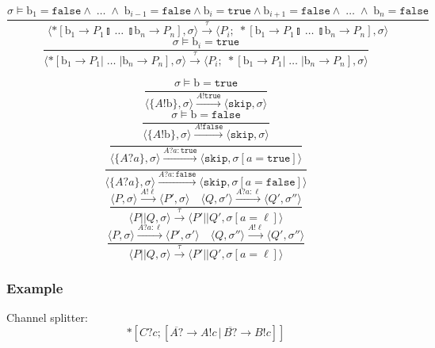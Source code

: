 \documentclass[compress]{beamer}
\begin{document}
\begin{frame}
$$    %
        \frac{\sigma \models \mathrm{b}_1 = \mathtt{false} \wedge \; \ldots \; \wedge \; \mathrm{b}_{i-1} = \mathtt{false} \wedge \mathrm{b}_i = \mathtt{true} \wedge \mathrm{b}_{i+1} = \mathtt{false} \wedge \; \ldots \; \wedge \; \mathrm{b}_n = \mathtt{false}} {\langle *[ \mathrm{b}_1 \rightarrow P_1  \talloblong \; \ldots \; \talloblong \mathrm{b}_n \rightarrow P_n ] , \sigma \rangle \xrightarrow{\tau} \langle P_i; \; *[ \mathrm{b}_1 \rightarrow P_1  \talloblong \; \ldots \; \talloblong \mathrm{b}_n \rightarrow P_n ] , \sigma\rangle  } $$$$
        \frac{\sigma \models \mathrm{b}_i = \mathtt{true}} {\langle *[ \mathrm{b}_1 \rightarrow P_1  | \; \ldots \; | \mathrm{b}_n \rightarrow P_n ] , \sigma \rangle \xrightarrow{\tau} \langle P_i;\;*[ \mathrm{b}_1 \rightarrow P_1  | \; \ldots \; | \mathrm{b}_n \rightarrow P_n ] , \sigma\rangle  }
    $$
\end{frame}
\begin{frame}
    \small
    $$
        \frac{\sigma \models \mathrm{b} = \mathtt{true}}{\langle \{A!\mathrm{b}\}, \sigma \rangle \xrightarrow{A!\mathtt{true}} \langle \mathtt{skip}, \sigma \rangle} $$$$
        \frac{\sigma \models \mathrm{b} = \mathtt{false}}{\langle \{A!\mathrm{b}\}, \sigma \rangle \xrightarrow{A!\mathtt{false}} \langle \mathtt{skip}, \sigma \rangle} $$$$
        \frac{}{\langle \{A?a\}, \sigma \rangle \xrightarrow{A?a : \mathtt{true}} \langle \mathtt{skip}, \sigma[a = \mathtt{true}] \rangle} $$$$
        \frac{}{\langle \{A?a\}, \sigma \rangle \xrightarrow{A?a : \mathtt{false}} \langle \mathtt{skip}, \sigma[a = \mathtt{false}] \rangle} $$$$
        \frac{\langle P, \sigma \rangle \xrightarrow{A!\ell} \langle P', \sigma \rangle \quad \langle Q, \sigma' \rangle \xrightarrow{A?a : \ell} \langle Q', \sigma'' \rangle}{\langle P || Q, \sigma \rangle \xrightarrow{\tau} \langle P' || Q', \sigma[a = \ell] \rangle} $$$$
        \frac{\langle P, \sigma \rangle \xrightarrow{A?a : \ell} \langle P', \sigma' \rangle \quad \langle Q, \sigma'' \rangle \xrightarrow{A!\ell} \langle Q', \sigma'' \rangle}{\langle P || Q, \sigma \rangle \xrightarrow{\tau} \langle P' || Q', \sigma[a = \ell] \rangle}
    $$
\end{frame}
\begin{frame}
    \frametitle{Example}
    Channel splitter:
    {\small $$*[C?c; [\overline{A?} \rightarrow A!c \, | \, \overline{B?} \rightarrow B!c]]$$}
\end{frame}
\end{document}
